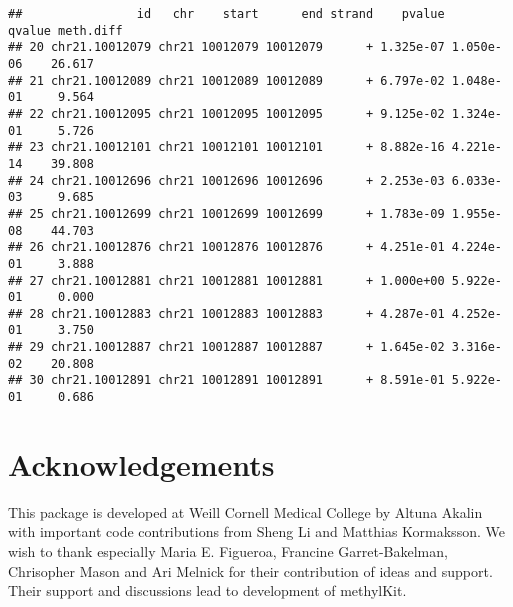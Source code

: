 \documentclass{article}
\makeatletter
\newenvironment{kframe}{%
 \def\FrameCommand##1{\hskip\@totalleftmargin \hskip-\fboxsep
 \colorbox{shadecolor}{##1}\hskip-\fboxsep
     \hskip-\linewidth \hskip-\@totalleftmargin \hskip\columnwidth}%
 \MakeFramed {\advance\hsize-\width
   \@totalleftmargin\z@ \linewidth\hsize
   \@setminipage}}%
 {\par\unskip\endMakeFramed}
\newenvironment{knitrout}{}{} %
\makeatother
\begin{document}
\begin{knitrout}
{\begin{kframe}
\begin{flushleft}
\normalfont
\end{flushleft}
\begin{verbatim}
##                id   chr    start      end strand    pvalue    qvalue meth.diff
## 20 chr21.10012079 chr21 10012079 10012079      + 1.325e-07 1.050e-06    26.617
## 21 chr21.10012089 chr21 10012089 10012089      + 6.797e-02 1.048e-01     9.564
## 22 chr21.10012095 chr21 10012095 10012095      + 9.125e-02 1.324e-01     5.726
## 23 chr21.10012101 chr21 10012101 10012101      + 8.882e-16 4.221e-14    39.808
## 24 chr21.10012696 chr21 10012696 10012696      + 2.253e-03 6.033e-03     9.685
## 25 chr21.10012699 chr21 10012699 10012699      + 1.783e-09 1.955e-08    44.703
## 26 chr21.10012876 chr21 10012876 10012876      + 4.251e-01 4.224e-01     3.888
## 27 chr21.10012881 chr21 10012881 10012881      + 1.000e+00 5.922e-01     0.000
## 28 chr21.10012883 chr21 10012883 10012883      + 4.287e-01 4.252e-01     3.750
## 29 chr21.10012887 chr21 10012887 10012887      + 1.645e-02 3.316e-02    20.808
## 30 chr21.10012891 chr21 10012891 10012891      + 8.591e-01 5.922e-01     0.686
\end{verbatim}
\end{kframe}}
\end{knitrout}



\section{Acknowledgements}
This package is developed at Weill Cornell Medical College by Altuna Akalin with important code contributions from Sheng Li and Matthias Kormaksson. We wish to thank especially Maria E. Figueroa, Francine Garret-Bakelman, Chrisopher Mason and Ari Melnick for their contribution of ideas and support. Their support and discussions lead to development of methylKit.
\end{document}
